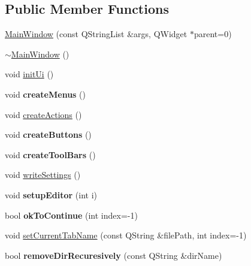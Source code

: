\subsection*{Public Member Functions}
\begin{DoxyCompactItemize}
\item 
\hyperlink{class_main_window_affc2bb4c6ca84428e7121d8aac999164}{Main\+Window} (const Q\+String\+List \&args, Q\+Widget $\ast$parent=0)
\item 
\hyperlink{class_main_window_ae98d00a93bc118200eeef9f9bba1dba7}{$\sim$\+Main\+Window} ()
\item 
void \hyperlink{class_main_window_ad233094d8a8d6f41d81d845d1c4eb1ee}{init\+Ui} ()
\item 
\hypertarget{class_main_window_aa4907b0251d305659e403c62921ef331}{}void {\bfseries create\+Menus} ()\label{class_main_window_aa4907b0251d305659e403c62921ef331}

\item 
void \hyperlink{class_main_window_a62cd8712fb41a754298f6f60eead2cb0}{create\+Actions} ()
\item 
\hypertarget{class_main_window_a3a5152074fdfc6e75c6f86e55fcba28d}{}void {\bfseries create\+Buttons} ()\label{class_main_window_a3a5152074fdfc6e75c6f86e55fcba28d}

\item 
\hypertarget{class_main_window_acce4e32b95d3d5cb48470c053a1740c2}{}void {\bfseries create\+Tool\+Bars} ()\label{class_main_window_acce4e32b95d3d5cb48470c053a1740c2}

\item 
void \hyperlink{class_main_window_a49be45fc9b993fdc3afe55d4b6fa0650}{write\+Settings} ()
\item 
\hypertarget{class_main_window_a22a92325046401ede7a21e64728dd10b}{}void {\bfseries setup\+Editor} (int i)\label{class_main_window_a22a92325046401ede7a21e64728dd10b}

\item 
\hypertarget{class_main_window_a2ac2a11c4c75f5ee65f61e5c373581f6}{}bool {\bfseries ok\+To\+Continue} (int index=-\/1)\label{class_main_window_a2ac2a11c4c75f5ee65f61e5c373581f6}

\item 
void \hyperlink{class_main_window_a8f3241a37f8995ca0c20aeebdd2bfc24}{set\+Current\+Tab\+Name} (const Q\+String \&file\+Path, int index=-\/1)
\item 
\hypertarget{class_main_window_ad0252b4ac212cce0738ac8678309b2a0}{}bool {\bfseries remove\+Dir\+Recuresively} (const Q\+String \&dir\+Name)\label{class_main_window_ad0252b4ac212cce0738ac8678309b2a0}

\end{DoxyCompactItemize}
